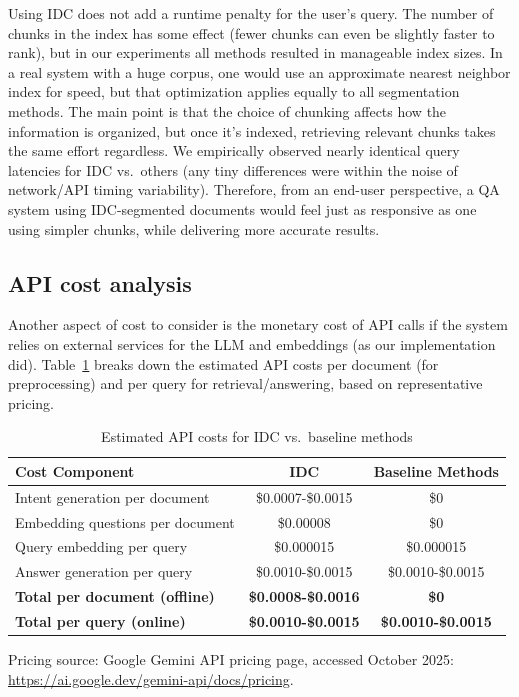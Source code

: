 \documentclass[12pt,a4paper]{report}
\begin{document}
Using IDC does not add a runtime penalty for the user's query. The number of chunks in the index has some effect (fewer chunks can even be slightly faster to rank), but in our experiments all methods resulted in manageable index sizes. In a real system with a huge corpus, one would use an approximate nearest neighbor index for speed, but that optimization applies equally to all segmentation methods. The main point is that the choice of chunking affects how the information is organized, but once it's indexed, retrieving relevant chunks takes the same effort regardless. We empirically observed nearly identical query latencies for IDC vs.\ others (any tiny differences were within the noise of network/API timing variability). Therefore, from an end-user perspective, a QA system using IDC-segmented documents would feel just as responsive as one using simpler chunks, while delivering more accurate results.

\subsection{API cost analysis}\label{sec:api-cost}

Another aspect of cost to consider is the monetary cost of API calls if the system relies on external services for the LLM and embeddings (as our implementation did). Table~\ref{tab:api_costs} breaks down the estimated API costs per document (for preprocessing) and per query for retrieval/answering, based on representative pricing.

\begin{table}[h!]
\centering
\caption{Estimated API costs for IDC vs.\ baseline methods}
\label{tab:api_costs}
\small
\begin{tabular}{lcc}
\hline
\textbf{Cost Component} & \textbf{IDC} & \textbf{Baseline Methods} \\
\hline
Intent generation per document & \$0.0007-\$0.0015 & \$0 \\
Embedding questions per document & \$0.00008 & \$0 \\
Query embedding per query & \$0.000015 & \$0.000015 \\
Answer generation per query & \$0.0010-\$0.0015 & \$0.0010-\$0.0015 \\
\hline
\textbf{Total per document (offline)} & \textbf{\$0.0008-\$0.0016} & \textbf{\$0} \\
\textbf{Total per query (online)} & \textbf{\$0.0010-\$0.0015} & \textbf{\$0.0010-\$0.0015} \\
\hline
\end{tabular}
\end{table}
\noindent\footnotesize{Pricing source: Google Gemini API pricing page, accessed October 2025: \url{https://ai.google.dev/gemini-api/docs/pricing}.}\normalsize
\end{document}
